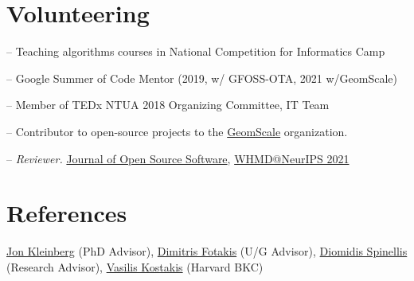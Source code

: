 \documentclass[margin, 10pt]{res}
\begin{document}
\begin{resume}
\section{Volunteering} 
\begin{compactitem}
    \item[--] Teaching algorithms courses in National Competition for Informatics Camp 
    \item[--] Google Summer of Code Mentor (2019, w/ GFOSS-OTA, 2021 w/GeomScale)
    \item[--] Member of TEDx NTUA 2018 Organizing Committee, IT Team 
    \item[--] Contributor to open-source projects to the \href{https://geomscale.github.io/}{GeomScale} organization.
    \item [--] \emph{Reviewer.} \href{https://joss.theoj.org/}{Journal of Open Source Software}, \href{https://sites.google.com/view/whmd2021}{WHMD@NeurIPS 2021}

\end{compactitem}

\section{References}

\href{mailto:kleinberg@cornell.edu}{Jon Kleinberg} (PhD Advisor), 
\href{mailto:fotakis@cs.ntua.gr}{Dimitris Fotakis}  (U/G Advisor),
\href{mailto:dds@aueb.gr}{Diomidis Spinellis} (Research Advisor), 
\href{mailto:kostakis@law.harvard.edu}{Vasilis Kostakis}  (Harvard BKC) 



\end{resume}
\end{document}
